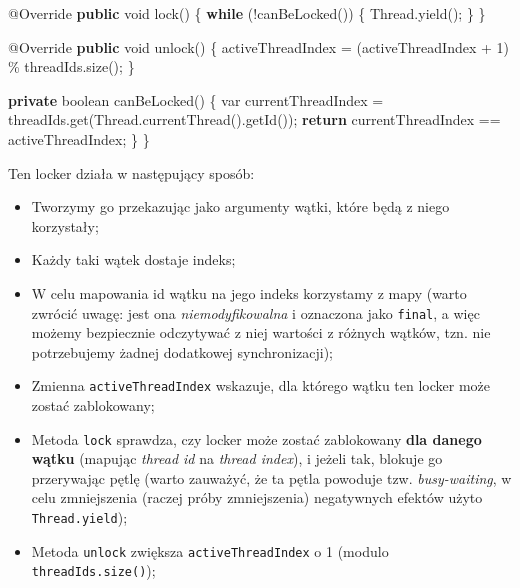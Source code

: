 \documentclass[11pt]{article}
\providecommand{\tightlist}{%
      \setlength{\itemsep}{0pt}\setlength{\parskip}{0pt}}
\newenvironment{Shaded}{}{}
\newcommand{\KeywordTok}[1]{\textcolor[rgb]{0.00,0.44,0.13}{\textbf{{#1}}}}
\newcommand{\DataTypeTok}[1]{\textcolor[rgb]{0.56,0.13,0.00}{{#1}}}
\newcommand{\DecValTok}[1]{\textcolor[rgb]{0.25,0.63,0.44}{{#1}}}
\newcommand{\FunctionTok}[1]{\textcolor[rgb]{0.02,0.16,0.49}{{#1}}}
\newcommand{\NormalTok}[1]{{#1}}
\newcommand{\ControlFlowTok}[1]{\textcolor[rgb]{0.00,0.44,0.13}{\textbf{{#1}}}}
\newcommand{\OperatorTok}[1]{\textcolor[rgb]{0.40,0.40,0.40}{{#1}}}
\newcommand{\BuiltInTok}[1]{{#1}}
\newcommand{\AttributeTok}[1]{\textcolor[rgb]{0.49,0.56,0.16}{{#1}}}
\begin{document}
\begin{Shaded}
\begin{Highlighting}[]
    \AttributeTok{@Override}
    \KeywordTok{public} \DataTypeTok{void} \FunctionTok{lock}\OperatorTok{()} \OperatorTok{\{}
        \ControlFlowTok{while} \OperatorTok{(!}\FunctionTok{canBeLocked}\OperatorTok{())} \OperatorTok{\{}
            \BuiltInTok{Thread}\OperatorTok{.}\FunctionTok{yield}\OperatorTok{();}
        \OperatorTok{\}}
    \OperatorTok{\}}

    \AttributeTok{@Override}
    \KeywordTok{public} \DataTypeTok{void} \FunctionTok{unlock}\OperatorTok{()} \OperatorTok{\{}
\NormalTok{        activeThreadIndex }\OperatorTok{=} \OperatorTok{(}\NormalTok{activeThreadIndex }\OperatorTok{+} \DecValTok{1}\OperatorTok{)} \OperatorTok{\%}\NormalTok{ threadIds}\OperatorTok{.}\FunctionTok{size}\OperatorTok{();}
    \OperatorTok{\}}

    \KeywordTok{private} \DataTypeTok{boolean} \FunctionTok{canBeLocked}\OperatorTok{()} \OperatorTok{\{}
        \DataTypeTok{var}\NormalTok{ currentThreadIndex }\OperatorTok{=}\NormalTok{ threadIds}\OperatorTok{.}\FunctionTok{get}\OperatorTok{(}\BuiltInTok{Thread}\OperatorTok{.}\FunctionTok{currentThread}\OperatorTok{().}\FunctionTok{getId}\OperatorTok{());}
        \ControlFlowTok{return}\NormalTok{ currentThreadIndex }\OperatorTok{==}\NormalTok{ activeThreadIndex}\OperatorTok{;}
    \OperatorTok{\}}
\OperatorTok{\}}
\end{Highlighting}
\end{Shaded}

Ten locker działa w następujący sposób:

\begin{itemize}
\tightlist
\item
  Tworzymy go przekazując jako argumenty wątki, które będą z niego
  korzystały;
\item
  Każdy taki wątek dostaje indeks;
\item
  W celu mapowania id wątku na jego indeks korzystamy z mapy (warto
  zwrócić uwagę: jest ona \emph{niemodyfikowalna} i oznaczona jako
  \texttt{final}, a więc możemy bezpiecznie odczytywać z niej wartości z
  różnych wątków, tzn. nie potrzebujemy żadnej dodatkowej
  synchronizacji);
\item
  Zmienna \texttt{activeThreadIndex} wskazuje, dla którego wątku ten
  locker może zostać zablokowany;
\item
  Metoda \texttt{lock} sprawdza, czy locker może zostać zablokowany
  \textbf{dla danego wątku} (mapując \emph{thread id} na \emph{thread
  index}), i jeżeli tak, blokuje go przerywając pętlę (warto zauważyć,
  że ta pętla powoduje tzw. \emph{busy-waiting}, w celu zmniejszenia
  (raczej próby zmniejszenia) negatywnych efektów użyto
  \texttt{Thread.yield});
\item
  Metoda \texttt{unlock} zwiększa \texttt{activeThreadIndex} o 1 (modulo
  \texttt{threadIds.size()});
\end{itemize}
\end{document}
